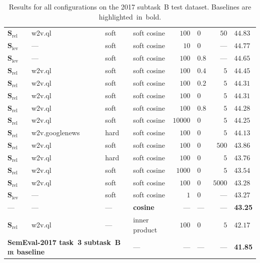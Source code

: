 \documentclass[
  digital, %
  notable, %
  lof,     %
  lot,     %
  nopalatino, color
]{fithesis3}
\newenvironment{liningfigs}{\renewcommand*{\rmdefault}{zpltlf}\normalfont}{}
\def\abbr#1{\textsc{\MakeLowercase{#1}}}
\begin{document}
\begin{table}
\begin{liningfigs}
\begin{tabular}{llllrlrl}
$\mathbf S_{\textrm{rel}}$ & w2v.ql & soft & soft cosine & $100$ & $0$ & $50$ & $44.83$ \\
$\mathbf S_{\textrm{lev}}$ & --- & soft & soft cosine & $10$ & $0$ & --- & $44.77$ \\
$\mathbf S_{\textrm{lev}}$ & --- & soft & soft cosine & $100$ & $0.8$ & --- & $44.65$ \\
$\mathbf S_{\textrm{rel}}$ & w2v.ql & soft & soft cosine & $100$ & $0.4$ & $5$ & $44.45$ \\
$\mathbf S_{\textrm{rel}}$ & w2v.ql & soft & soft cosine & $100$ & $0.2$ & $5$ & $44.31$ \\
$\mathbf S_{\textrm{rel}}$ & w2v.ql & soft & soft cosine & $100$ & $0$ & $5$ & $44.31$ \\
$\mathbf S_{\textrm{rel}}$ & w2v.ql & soft & soft cosine & $100$ & $0.8$ & $5$ & $44.28$ \\
$\mathbf S_{\textrm{rel}}$ & w2v.ql & soft & soft cosine & $10000$ & $0$ & $5$ & $44.25$ \\
$\mathbf S_{\textrm{rel}}$ & w2v.googlenews & hard & soft cosine & $100$ & $0$ & $5$ & $44.13$ \\
$\mathbf S_{\textrm{rel}}$ & w2v.ql & soft & soft cosine & $100$ & $0$ & $500$ & $43.86$ \\
$\mathbf S_{\textrm{rel}}$ & w2v.ql & hard & soft cosine & $100$ & $0$ & $5$ & $43.76$ \\
$\mathbf S_{\textrm{rel}}$ & w2v.ql & soft & soft cosine & $1000$ & $0$ & $5$ & $43.54$ \\
$\mathbf S_{\textrm{rel}}$ & w2v.ql & soft & soft cosine & $100$ & $0$ & $5000$ & $43.28$ \\
$\mathbf S_{\textrm{lev}}$ & --- & soft & soft cosine & $1$ & $0$ & --- & $43.27$ \\
--- & --- & --- & \bfseries cosine & --- & --- & --- & \bfseries 43.25 \\
$\mathbf S_{\textrm{rel}}$ & w2v.ql & --- & inner product & $100$ & $0$ & $5$ & $42.17$ \\
\multicolumn{3}{l}{\bfseries SemEval-2017 task~3 subtask~B \abbr{IR}\index{ir@\protect\abbr{IR}} baseline} &
  --- &
  --- &
  --- &
  --- &
  \bfseries41.85 \\
\end{tabular}
\end{liningfigs}
\caption[Results for all configurations on the SemEval-2017 task~3
subtask~B test dataset]{%
  Results for all configurations on the 2017 subtask~B test dataset.
  Baselines are highlighted~in~bold.}
\label{tab:similarity-results-2017}
\end{table}
\end{document}
